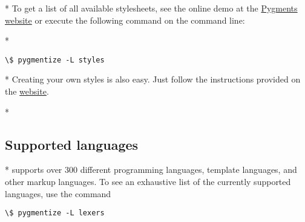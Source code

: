 \begin{paracol}{2}
\switchcolumn[0]*%
To get a list of all available stylesheets, see the online demo at the \href{http://pygments.org/demo/}{Pygments website} or execute the following command on the command line:
\switchcolumn

\switchcolumn[0]*%
\begin{Verbatim}[commandchars=\\\{\}]
\$ pygmentize -L styles
\end{Verbatim}

\switchcolumn

\switchcolumn[0]*%
Creating your own styles is also easy. Just follow the instructions provided on the
\href{http://pygments.org/docs/styles/#creating-own-styles}{ website}.

\switchcolumn

\switchcolumn[0]*%
\subsection{Supported languages}
\switchcolumn

\switchcolumn[0]*%
 supports over 300 different programming languages, template languages, and other markup languages.  To see an exhaustive list of the currently supported languages, use the command

\begin{Verbatim}[commandchars=\\\{\}]
\$ pygmentize -L lexers
\end{Verbatim}

\end{paracol}